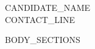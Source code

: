 \documentclass[letterpaper,10.5pt]{article}
\begin{document}
\begin{center}
    {\Huge\scshape {{CANDIDATE_NAME}}} \\[4pt]
    \small {{CONTACT_LINE}}
\end{center}
\vspace{-6pt}

{{BODY_SECTIONS}}
\end{document}
